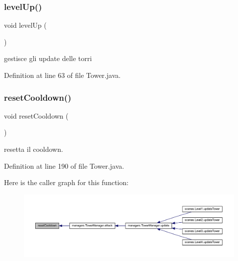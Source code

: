 \subsubsection{\texorpdfstring{level\+Up()}{levelUp()}}
{\footnotesize\ttfamily void level\+Up (\begin{DoxyParamCaption}{ }\end{DoxyParamCaption})}



gestisce gli update delle torri 



Definition at line 63 of file Tower.\+java.

\mbox{\label{classtowers_1_1_tower_ac49a5c9f0a8fcb8b68449da989b93542}} 
\subsubsection{\texorpdfstring{reset\+Cooldown()}{resetCooldown()}}
{\footnotesize\ttfamily void reset\+Cooldown (\begin{DoxyParamCaption}{ }\end{DoxyParamCaption})}



resetta il cooldown. 



Definition at line 190 of file Tower.\+java.

Here is the caller graph for this function\+:
\nopagebreak
\begin{figure}[H]
\begin{center}
\leavevmode
\includegraphics[width=350pt]{classtowers_1_1_tower_ac49a5c9f0a8fcb8b68449da989b93542_icgraph}
\end{center}
\end{figure}
\mbox{\label{classtowers_1_1_tower_a120aaa641fb05cbcbe27057048519fa7}} 
